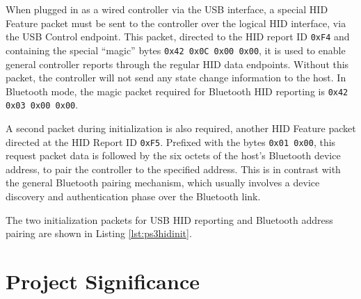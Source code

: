 When plugged in as a wired controller via the USB interface, a special HID Feature packet must be sent to the controller over the logical HID interface, via the USB Control endpoint. This packet, directed to the HID report ID \texttt{0xF4} and containing the special ``magic'' bytes \texttt{0x42 0x0C 0x00 0x00}, it is used to enable general controller reports through the regular HID data endpoints. Without this packet, the controller will not send any state change information to the host. In Bluetooth mode, the magic packet required for Bluetooth HID reporting is \texttt{0x42 0x03 0x00 0x00}.

A second packet during initialization is also required, another HID Feature packet directed at the HID Report ID \texttt{0xF5}. Prefixed with the bytes \texttt{0x01 0x00}, this request packet data is followed by the six octets of the host's Bluetooth device address, to pair the controller to the specified address. This is in contrast with the general Bluetooth pairing mechanism, which usually involves a device discovery and authentication phase over the Bluetooth link.

The two initialization packets for USB HID reporting and Bluetooth address pairing are shown in Listing \ref{lst:ps3hidinit}.



\section{Project Significance}

